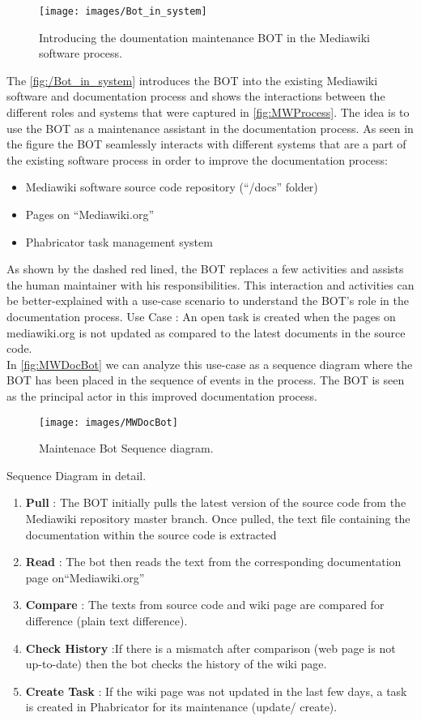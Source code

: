 \begin{figure}[H]
  \centering
  \texttt{[image: images/Bot\_in\_system]}
  \caption[Introducing the doumentation maintenance BOT in the Mediawiki software process]{Introducing the doumentation maintenance BOT in the Mediawiki software process.}\label{fig:/Bot_in_system}
\end{figure}
The \autoref{fig:/Bot_in_system} introduces the BOT into the existing Mediawiki software and documentation process and shows the interactions between the different roles and systems that were captured in \autoref{fig:MWProcess}.
\newline The idea is to use the BOT as a maintenance assistant in the documentation process. As seen in the figure the BOT seamlessly interacts with different systems that are a part of the existing software process in order to improve the documentation process:
\begin{itemize}
\item Mediawiki software source code repository (\enquote{/docs} folder)
\item Pages on \enquote{Mediawiki.org}
\item Phabricator task management system
\end{itemize}
As shown by the dashed red lined, the BOT replaces a few activities and assists the human maintainer with his responsibilities.
This interaction and activities can be better-explained with a use-case scenario to understand the BOT's role in the documentation process. 
\indent Use Case : An open task is created when the pages on mediawiki.org is not updated as compared to the latest documents in the source code.
\\\indent  In \autoref{fig:MWDocBot} we can analyze this use-case as a sequence diagram where the BOT has been placed in the sequence of events in the process. The BOT is seen as the principal actor in this improved documentation process.
\begin{figure}[!htsb]
  \centering
  \texttt{[image: images/MWDocBot]}
  \caption[Maintenace Bot Sequence diagram]{Maintenace Bot Sequence diagram.}\label{fig:MWDocBot}
\end{figure}
Sequence Diagram in detail. 
\begin{enumerate}
\item \textbf{Pull} : The BOT initially pulls the latest version of the source code from the Mediawiki repository master branch. Once pulled, the text file containing the documentation within the source code is extracted
\item \textbf{Read} : The bot then reads the text from the corresponding documentation page on\enquote{Mediawiki.org}
\item \textbf{Compare} : The texts from source code and wiki page are compared for difference (plain text difference).
\item \textbf{Check History} :If there is a mismatch after comparison (web page is not up-to-date) then the bot checks the history of the wiki  page.
\item \textbf{Create Task} : If the wiki page was not updated in the last few days, a task is created in Phabricator for its maintenance (update/ create).
\end{enumerate}
